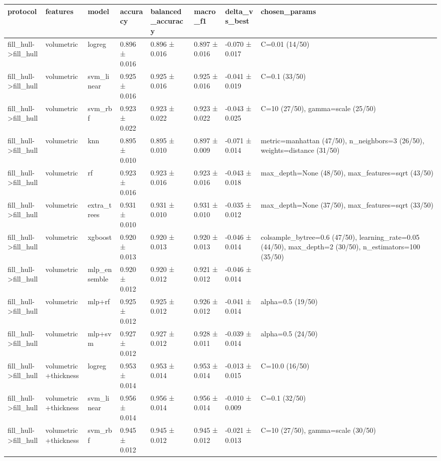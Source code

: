 \begin{tabular}{llllllll}
\toprule
protocol & features & model & accuracy & balanced\_accuracy & macro\_f1 & delta\_vs\_best & chosen\_params \\
\midrule
fill\_hull->fill\_hull & volumetric & logreg & 0.896 ± 0.016 & 0.896 ± 0.016 & 0.897 ± 0.016 & -0.070 ± 0.017 & C=0.01 (14/50) \\
fill\_hull->fill\_hull & volumetric & svm\_linear & 0.925 ± 0.016 & 0.925 ± 0.016 & 0.925 ± 0.016 & -0.041 ± 0.019 & C=0.1 (33/50) \\
fill\_hull->fill\_hull & volumetric & svm\_rbf & 0.923 ± 0.022 & 0.923 ± 0.022 & 0.923 ± 0.022 & -0.043 ± 0.025 & C=10 (27/50), gamma=scale (25/50) \\
fill\_hull->fill\_hull & volumetric & knn & 0.895 ± 0.010 & 0.895 ± 0.010 & 0.897 ± 0.009 & -0.071 ± 0.014 & metric=manhattan (47/50), n\_neighbors=3 (26/50), weights=distance (31/50) \\
fill\_hull->fill\_hull & volumetric & rf & 0.923 ± 0.016 & 0.923 ± 0.016 & 0.923 ± 0.016 & -0.043 ± 0.018 & max\_depth=None (48/50), max\_features=sqrt (43/50) \\
fill\_hull->fill\_hull & volumetric & extra\_trees & 0.931 ± 0.010 & 0.931 ± 0.010 & 0.931 ± 0.010 & -0.035 ± 0.012 & max\_depth=None (37/50), max\_features=sqrt (33/50) \\
fill\_hull->fill\_hull & volumetric & xgboost & 0.920 ± 0.013 & 0.920 ± 0.013 & 0.920 ± 0.013 & -0.046 ± 0.014 & colsample\_bytree=0.6 (47/50), learning\_rate=0.05 (44/50), max\_depth=2 (30/50), n\_estimators=100 (35/50) \\
fill\_hull->fill\_hull & volumetric & mlp\_ensemble & 0.920 ± 0.012 & 0.920 ± 0.012 & 0.921 ± 0.012 & -0.046 ± 0.014 &  \\
fill\_hull->fill\_hull & volumetric & mlp+rf & 0.925 ± 0.012 & 0.925 ± 0.012 & 0.926 ± 0.012 & -0.041 ± 0.014 & alpha=0.5 (19/50) \\
fill\_hull->fill\_hull & volumetric & mlp+svm & 0.927 ± 0.012 & 0.927 ± 0.012 & 0.928 ± 0.011 & -0.039 ± 0.014 & alpha=0.5 (24/50) \\
fill\_hull->fill\_hull & volumetric+thickness & logreg & 0.953 ± 0.014 & 0.953 ± 0.014 & 0.953 ± 0.014 & -0.013 ± 0.015 & C=10.0 (16/50) \\
fill\_hull->fill\_hull & volumetric+thickness & svm\_linear & 0.956 ± 0.014 & 0.956 ± 0.014 & 0.956 ± 0.014 & -0.010 ± 0.009 & C=0.1 (32/50) \\
fill\_hull->fill\_hull & volumetric+thickness & svm\_rbf & 0.945 ± 0.012 & 0.945 ± 0.012 & 0.945 ± 0.012 & -0.021 ± 0.013 & C=10 (27/50), gamma=scale (30/50) \\

\end{tabular}
